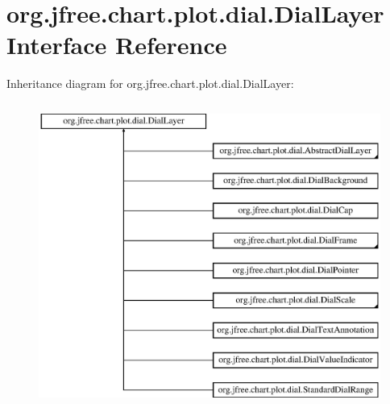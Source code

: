 \hypertarget{interfaceorg_1_1jfree_1_1chart_1_1plot_1_1dial_1_1_dial_layer}{}\section{org.\+jfree.\+chart.\+plot.\+dial.\+Dial\+Layer Interface Reference}
\label{interfaceorg_1_1jfree_1_1chart_1_1plot_1_1dial_1_1_dial_layer}
Inheritance diagram for org.\+jfree.\+chart.\+plot.\+dial.\+Dial\+Layer\+:\begin{figure}[H]
\begin{center}
\leavevmode
\includegraphics[height=10.000000cm]{interfaceorg_1_1jfree_1_1chart_1_1plot_1_1dial_1_1_dial_layer}
\end{center}
\end{figure}
